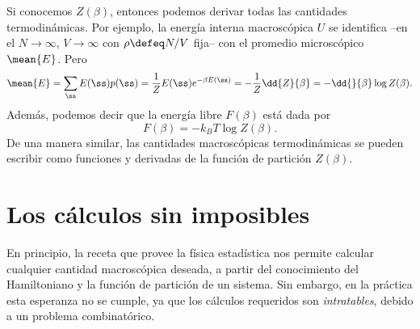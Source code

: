 Si conocemos $Z(\beta)$, entonces podemos derivar todas las cantidades
termodinámicas. Por ejemplo, la energía interna macroscópica $U$ se identifica
--en el  $N\to \infty$, $V \to \infty$ con $\rho
\defeq N/V$ fija-- con el promedio microscópico $\mean{E}$. Pero
\begin{equation}
\mean{E} =  \sum_{\ss} E(\ss) p(\ss) = \frac{1}{Z} E(\ss) e^{-\beta E(\ss)}  =
-\frac{1}{Z} \dd{Z}{\beta} = -\dd{}{\beta} \log Z(\beta).
\end{equation}
Además, podemos decir que la energía libre $F(\beta)$ está dada por
\begin{equation}
 F(\beta) = -k_B T \log Z(\beta).
\end{equation}
De una manera similar, las cantidades macroscópicas termodinámicas se pueden
escribir como funciones y derivadas de la función de partición $Z(\beta)$.

\section{Los cálculos sin imposibles}
En principio, la receta que provee la física estadística nos permite calcular
cualquier cantidad macroscópica deseada, a partir del conocimiento del
Hamiltoniano y la función de partición de un sistema. Sin embargo, en la
práctica esta esperanza no se cumple, ya que los cálculos requeridos son
\emph{intratables}, debido a un problema combinatórico.





